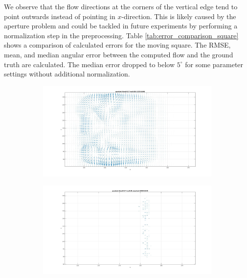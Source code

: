 We observe that the flow directions at the corners of the vertical edge tend to point outwards instead of pointing in $x$-direction. 
This is likely caused by the aperture problem and could be tackled in future experiments by performing a normalization step in the preprocessing.
Table \ref{tab:error_comparison_square} shows a comparison of calculated errors for the moving square. The RMSE, mean, and median angular error between the computed flow and the ground truth are calculated. 
The median error dropped to below $5^\circ$ for some parameter settings without additional normalization. 


\begin{figure}[tb]
\centering
\begin{subfigure}{.45\textwidth}
  \centering
  \includegraphics[height=.6\linewidth]{figs/quadrat_close.jpg}
  \caption{}
  \label{fig:qaudrat-close-masking-1}
\end{subfigure}
\begin{subfigure}{.45\textwidth}
  \centering
  \includegraphics[height=.6\linewidth]{figs/quadrat_close_mask.jpg}

\end{subfigure}
\end{figure}
